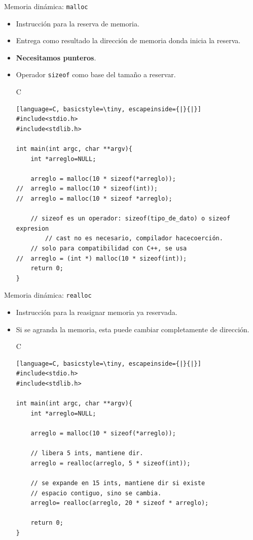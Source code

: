 \documentclass{beamer}
\begin{document}
\begin{frame}[fragile]{Memoria dinámica: \texttt{malloc}}
\begin{itemize}
\item Instrucción para la reserva de memoria.
\item Entrega como resultado la dirección de memoria donda inicia la reserva.
\item \textbf{Necesitamos punteros}.
\item Operador \texttt{sizeof} como base del tamaño a reservar. 
\begin{exampleblock}{C}
\begin{lstlisting}[language=C, basicstyle=\tiny, escapeinside={|}{|}]
#include<stdio.h>
#include<stdlib.h>

int main(int argc, char **argv){
	int *arreglo=NULL;

	arreglo = malloc(10 * sizeof(*arreglo));
//	arreglo = malloc(10 * sizeof(int));
//	arreglo = malloc(10 * sizeof *arreglo); 

	// sizeof es un operador: sizeof(tipo_de_dato) o sizeof expresion
        // cast no es necesario, compilador hacecoerción.
	// solo para compatibilidad con C++, se usa
//	arreglo = (int *) malloc(10 * sizeof(int)); 
	return 0;
}
\end{lstlisting}
\end{exampleblock}
\end{itemize}
\end{frame}

\begin{frame}[fragile]{Memoria dinámica: \texttt{realloc}}
\begin{itemize}
\item Instrucción para la reasignar memoria ya reservada.
\item Si se agranda la memoria, esta puede cambiar completamente de dirección.
\begin{exampleblock}{C}
\begin{lstlisting}[language=C, basicstyle=\tiny, escapeinside={|}{|}]
#include<stdio.h>
#include<stdlib.h>

int main(int argc, char **argv){
	int *arreglo=NULL;

	arreglo = malloc(10 * sizeof(*arreglo));

	// libera 5 ints, mantiene dir.
	arreglo = realloc(arreglo, 5 * sizeof(int));

	// se expande en 15 ints, mantiene dir si existe
	// espacio contiguo, sino se cambia.
	arreglo= realloc(arreglo, 20 * sizeof * arreglo);

	return 0;
}
\end{lstlisting}
\end{exampleblock}
\end{itemize}
\end{frame}
\end{document}
